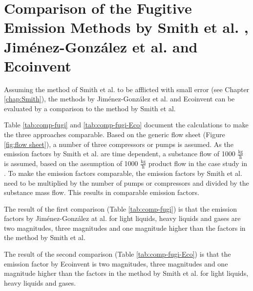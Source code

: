\section{Comparison of the Fugitive Emission Methods by Smith et al. \cite{Smith.2017}, Jiménez-González et al. \cite{JimenezGonzalez.2000} and Ecoinvent \cite{Hischier.2005}}

Assuming the method of Smith et al. to be afflicted with small error (see Chapter \ref{chap:Smith}), the methods by Jiménez-González et al. and Ecoinvent can be evaluated by a  comparison to the method by Smith et al.

Table \ref{tab:comp-fugi} and \ref{tab:comp-fugi-Eco} document the calculations to make the three approaches comparable. Based on the generic flow sheet (Figure \ref{fig:flow sheet}), a number of three compressors or pumps is assumed. As the emission factors by Smith et al. are time dependent, a substance flow of 1000 $\frac{\mathrm{kg}}{\mathrm{h}}$ is assumed, based on the assumption of 1000 $\frac{\mathrm{kg}}{\mathrm{h}}$ product flow in the case study in \cite{JimenezGonzalez.2000}. To make the emission factors comparable, the emission factors by Smith et al. need to be multiplied by the number of pumps or compressors and divided by the substance mass flow. This results in comparable emission factors.

The result of the first comparison (Table \ref{tab:comp-fugi}) is that the emission factors by Jiménez-González at al. for light liquids, heavy liquids and gases are two magnitudes, three magnitudes and one magnitude higher than the factors in the method by Smith et al.

The result of the second comparison (Table \ref{tab:comp-fugi-Eco}) is that the emission factor by Ecoinvent  is two magnitudes, three magnitudes and one magnitude higher than the factors in the method by Smith et al. for light liquids, heavy liquids and gases.

